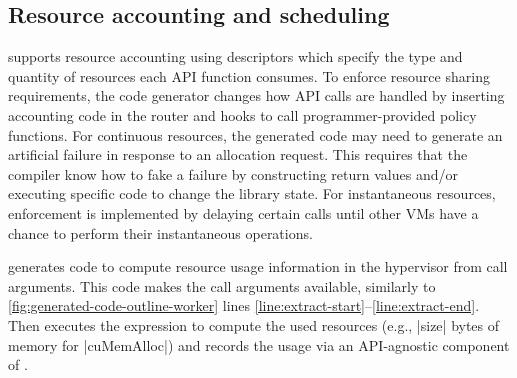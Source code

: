 {\subsection{Resource accounting and scheduling}

\CAvA supports resource accounting using \Lapis descriptors which specify the type and quantity of resources each API function consumes.
To enforce resource sharing requirements, the code generator changes how API calls are handled by inserting accounting code in the router and hooks to call programmer-provided policy functions.
For continuous resources, the generated code may need to generate an artificial failure in response to an allocation request.
This requires that the compiler know how to fake a failure by constructing return values and/or executing specific code to change the library state.
For instantaneous resources, enforcement is implemented by delaying certain calls until other VMs have a chance to perform their instantaneous operations.

\CAvA generates code to compute resource usage information in the hypervisor from call arguments.
This code makes the call arguments available, similarly to \autoref{fig:generated-code-outline-worker} lines \ref{line:extract-start}--\ref{line:extract-end}.
Then executes the expression to compute the used resources (e.g., \spec|size| bytes of memory for \spec|cuMemAlloc|) and records the usage via an API-agnostic component of \AvA.


}
